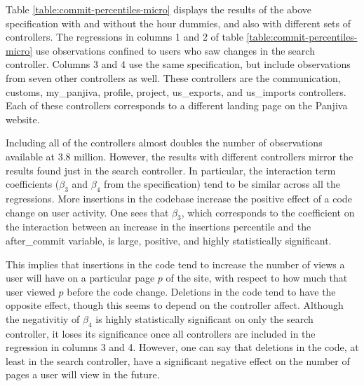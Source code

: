 \documentclass[10pt]{article}
\begin{document}
Table \ref{table:commit-percentiles-micro} displays the results of the above specification with and without the hour dummies, and also with different sets of controllers. The regressions in columns 1 and 2 of table \ref{table:commit-percentiles-micro} use observations confined to users who saw changes in the search controller. Columns 3 and 4 use the same specification, but include observations from seven other controllers as well. These controllers are the communication, customs, my\_panjiva, profile, project, us\_exports, and us\_imports controllers. Each of these controllers corresponds to a different landing page on the Panjiva website.

Including all of the controllers almost doubles the number of observations available at 3.8 million. However, the results with different controllers mirror the results found just in the search controller. In particular, the interaction term coefficients ($\beta_3$ and $\beta_4$ from the specification) tend to be similar across all the regressions. More insertions in the codebase increase the positive effect of a code change on user activity. One sees that $\beta_3$, which corresponds to the coefficient on the interaction between an increase in the insertions percentile and the after\_commit variable, is large, positive, and highly statistically significant. 

This implies that insertions in the code tend to increase the number of views a user will have on a particular page $p$ of the site, with respect to how much that user viewed $p$ before the code change. Deletions in the code tend to have the opposite effect, though this seems to depend on the controller affect. Although the negativitiy of $\beta_4$ is highly statistically significant on only the search controller, it loses its significance once all controllers are included in the regression in columns 3 and 4. However, one can say that deletions in the code, at least in the search controller, have a significant negative effect on the number of pages a user will view in the future.
\end{document}
